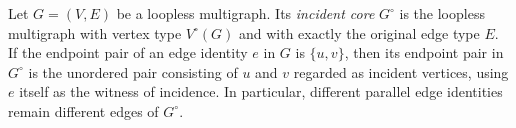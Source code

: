 \begin{definition}
Let $G=(V,E)$ be a loopless multigraph.  Its \emph{incident core}
$G^{\circ}$ is the loopless multigraph with vertex type $V^{\circ}(G)$ and
with exactly the original edge type $E$.  If the endpoint pair of an edge
identity $e$ in $G$ is $\{u,v\}$, then its endpoint pair in $G^{\circ}$ is
the unordered pair consisting of $u$ and $v$ regarded as incident vertices,
using $e$ itself as the witness of incidence.  In particular, different
parallel edge identities remain different edges of $G^{\circ}$.
\end{definition}
